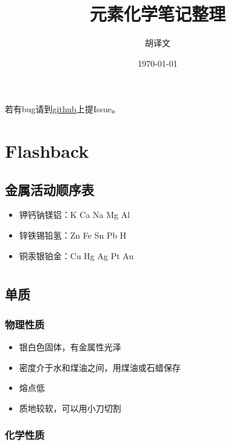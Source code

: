 \documentclass[a4paper]{article}
\title{元素化学笔记整理}
\author{胡译文}
\date{\today}
\renewcommand\contentsname{目录}
\begin{document}
	\maketitle
	\begin{center}
		若有bug请到{\color{red}\href{https://github.com/huyiwen/Chem}{github}}上提Issue。
	\end{center}
	\renewcommand\contentsname{目录}
	\tableofcontents
	
	
	\clearpage
	\section*{Flashback}
	\subsection{金属活动顺序表}
	\begin{itemize}
		\item 钾钙钠镁铝：K Ca Na Mg Al
		\item 锌铁锡铅氢：Zn Fe Sn Pb H
		\item 铜汞银铂金：Cu Hg Ag Pt Au
	\end{itemize}
	
	
	\clearpage
	\section{}
	\subsection{单质}
	\subsubsection{物理性质}
	\begin{itemize}
		\item 银白色固体，有金属性光泽
		\item 密度介于水和煤油之间，用煤油或石蜡保存
		\item 熔点低
		\item 质地较软，可以用小刀切割
	\end{itemize}
	
	\subsubsection{化学性质}
\end{document}
